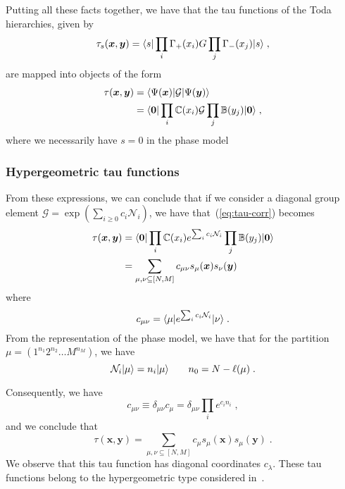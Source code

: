 \documentclass[a4paper,11pt]{amsart}
\begin{document}
Putting all these facts together, we have that the tau functions of the Toda 
hierarchies, given by
\begin{equation}
  \tau_s(\bm{x}, \bm{y}) = \langle s\rvert \prod_{i} \Gamma_+(x_i) G \prod_j \Gamma_-(x_j) \lvert s\rangle\; ,
\end{equation}
are mapped into objects of the form 
\begin{equation}
\label{eq:tau-corr}
\begin{split}
  \tau(\bm{x}, \bm{y}) & = \langle\Psi(\bm{x})\rvert \mathcal{G} \lvert\Psi(\bm{y})\rangle \\
  & = \langle\bm{0}\rvert \prod_{i} \mathbb{C}(x_i)
  \mathcal{G} \prod_j \mathbb{B}(y_j) \lvert\bm{0}\rangle\; ,
\end{split}
\end{equation}
where we necessarily have \(s=0\) in the phase model


\subsubsection{Hypergeometric tau functions}
From these expressions, we can conclude that if we consider a diagonal
group element \(\mathcal{G} = \exp \left( \sum_{i\geq 0} c_i
\mathcal{N}_i\right)\), we have that~(\ref{eq:tau-corr}) becomes
\begin{equation}
\begin{split}
  \tau(\bm{x}, \bm{y}) 
  & = \langle\bm{0}\rvert \prod_{i} \mathbb{C}(x_i)
  e^{\sum_i c_i \mathcal{N}_i} \prod_j \mathbb{B}(y_j) \lvert\bm{0}\rangle\\
  & = \sum_{\mu, \nu \subseteq [N,M]} c_{\mu\nu} s_\mu(\bm{x}) s_\nu(\bm{y})
\end{split}
\end{equation}
where
\begin{equation}
  c_{\mu \nu} = \langle\mu\rvert e^{\sum_i c_i \mathcal{N}_i}\lvert\nu\rangle \; .
\end{equation}
From the representation of the phase model, we have that for the partition
\(\mu = (1^{n_1} 2^{n_2} \dots M^{n_M})\), we have
\begin{equation}
  \mathcal{N}_i \lvert\mu\rangle = n_i \lvert\mu\rangle \qquad n_0 = N - \ell(\mu)\; .
\end{equation}

Consequently, we have
\begin{equation}
  c_{\mu \nu} \equiv \delta_{\mu\nu} c_{\mu}  =  \delta_{\mu\nu} \prod_i e^{c_i n_i}\; , 
\end{equation}
and we conclude that 
\begin{equation}
  \tau(\bm{x}, \bm{y}) 
  = \sum_{\mu, \nu \subseteq [N,M]} c_{\mu} s_\mu(\bm{x}) s_\mu(\bm{y})\; .
\end{equation}
We observe that this tau function has diagonal coordinates
\(c_\lambda\). These tau functions belong to the hypergeometric type
considered in~\cite{Orlov:2000, orlov:2001, Orlov:2001b, Orlov:2005}.
\end{document}
